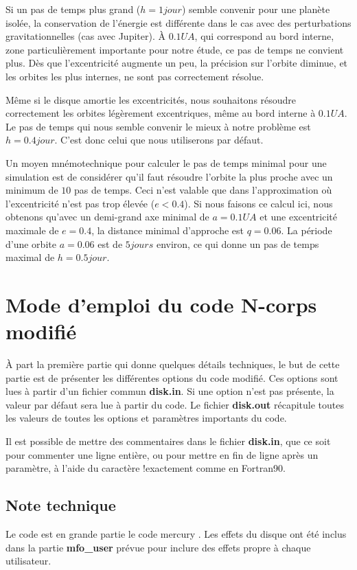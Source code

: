 Si un pas de temps plus grand ($h=1\unit{jour}$) semble convenir pour une planète isolée, la conservation de l'énergie est différente dans le cas avec des perturbations gravitationnelles (cas avec Jupiter). À $0.1\unit{UA}$, qui correspond au bord interne, zone particulièrement importante pour notre étude, ce pas de temps ne convient plus. Dès que l'excentricité augmente un peu, la précision sur l'orbite diminue, et les orbites les plus internes,  ne sont pas correctement résolue.

Même si le disque amortie les excentricités, nous souhaitons résoudre correctement les orbites légèrement excentriques, même au bord interne à $0.1\unit{UA}$. Le pas de temps qui nous semble convenir le mieux à notre problème est $h=0.4\unit{jour}$. C'est donc celui que nous utiliserons par défaut.

Un moyen mnémotechnique pour calculer le pas de temps minimal pour une simulation est de considérer qu'il faut résoudre l'orbite la plus proche avec un minimum de $10$ pas de temps. Ceci n'est valable que dans l'approximation où l'excentricité n'est pas trop élevée ($e<0.4$). Si nous faisons ce calcul ici, nous obtenons qu'avec un demi-grand axe minimal de $a=0.1\unit{UA}$ et une excentricité maximale de $e=0.4$, la distance minimal d'approche est $q=0.06$. La période d'une orbite $a=0.06$ est de $5\unit{jours}$ environ, ce qui donne un pas de temps maximal de $h=0.5\unit{jour}$. 


\section{Mode d'emploi du code N-corps modifié}
À part la première partie qui donne quelques détails techniques, le but de cette partie est de présenter les différentes options du code modifié. Ces options sont lues à partir d'un fichier commun \textbf{disk.in}. Si une option n'est pas présente, la valeur par défaut sera lue à partir du code. Le fichier \textbf{disk.out} récapitule toutes les valeurs de toutes les options et paramètres importants du code. 

\begin{remarque}
Il est possible de mettre des commentaires dans le fichier \textbf{disk.in}, que ce soit pour commenter une ligne entière, ou pour mettre en fin de ligne après un paramètre, à l'aide du caractère \og !\fg exactement comme en Fortran90.
\end{remarque}

\subsection{Note technique}
Le code est en grande partie le code mercury \cite{chambers1999hybrid}. Les effets du disque ont été inclus dans la partie \textbf{mfo\_user} prévue pour inclure des effets propre à chaque utilisateur. 

